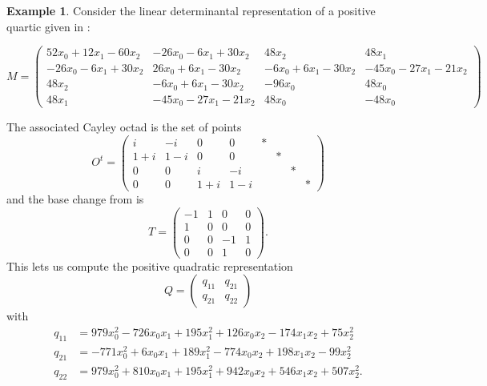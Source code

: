 \documentclass[a4paper,10pt]{amsart}
\theoremstyle{definition}
\newtheorem{ex}[Def]{Example}
\theoremstyle{plain}
\begin{document}
\begin{ex}
Consider the linear determinantal representation of a positive quartic given in \cite[Example 5.12]{plaumann}:

{\scriptsize{
\begin{equation*}
    M = \begin{pmatrix}
        52 x_0 + 12x_1 - 60x_2 & -26x_0 - 6x_1 + 30x_2 & 48x_2 & 48x_1 \\
        -26x_0 - 6x_1 + 30x_2 & 26x_0 + 6x_1 - 30x_2 & -6x_0 + 6x_1 - 30x_2 & -45x_0 - 27x_1 -21x_2 \\
        48x_2 & -6x_0 + 6x_1 - 30x_2 & -96x_0 & 48x_0 \\
        48x_1 & -45x_0 - 27x_1 -21x_2 & 48x_0 & -48x_0
    \end{pmatrix}
\end{equation*}
}}

The associated Cayley octad is the set of points
\begin{equation*}
    O^t = \begin{pmatrix}
        i & -i & 0 & 0 & * & & & \\
        1+i & 1-i & 0 & 0 & & * & & \\
        0 & 0 & i & -i & & & * & \\
        0 & 0 & 1+i & 1-i & & & & *
    \end{pmatrix}
\end{equation*}
and the base change from  is
\begin{equation*}
    T = \begin{pmatrix}
        -1 & 1 & 0 & 0 \\
        1 & 0 & 0 & 0 \\
        0 & 0 & -1 & 1 \\
        0 & 0 & 1 & 0
    \end{pmatrix}.
\end{equation*}
This lets us compute the positive quadratic representation
\begin{equation*}
    Q = \begin{pmatrix}
        q_{11} & q_{21} \\
        q_{21} & q_{22}
    \end{pmatrix}
\end{equation*}
with
\begin{align*}
    q_{11} &= 979x_0^2-726x_0x_1+195x_1^2+126x_0x_2-174x_1x_2+75x_2^2 \\
    q_{21} &= -771x_0^2+6x_0x_1+189x_1^2-774x_0x_2+198x_1x_2-99x_2^2 \\
    q_{22} &= 979x_0^2+810x_0x_1+195x_1^2+942x_0x_2+546x_1x_2+507x_2^2.
\end{align*}
\end{ex}
\end{document}
